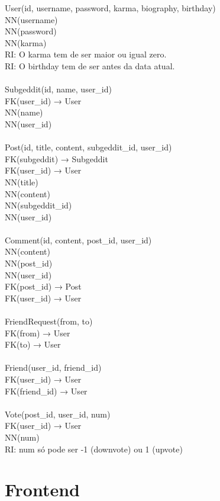 \documentclass{article}
\begin{document}
	User(id, username, password, karma, biography, birthday)\\
	NN(username)\\
	NN(password)\\
	NN(karma)\\
	RI: O karma tem de ser maior ou igual zero.\\
	RI: O birthday tem de ser antes da data atual.\\
	\\
	Subgeddit(id, name, user\_id)\\
	FK(user\_id) → User\\
	NN(name)\\
	NN(user\_id)\\
	\\
	Post(id, title, content, subgeddit\_id, user\_id)\\
	FK(subgeddit) → Subgeddit\\
	FK(user\_id) → User\\
	NN(title)\\
	NN(content)\\
	NN(subgeddit\_id)\\
	NN(user\_id)\\
	\\
	Comment(id, content, post\_id, user\_id)\\
	NN(content)\\
	NN(post\_id)\\
	NN(user\_id)\\
	FK(post\_id) → Post\\
	FK(user\_id) → User\\
	\\
	FriendRequest(from, to)\\
	FK(from) → User\\
	FK(to) → User\\
	\\
	Friend(user\_id, friend\_id)\\
	FK(user\_id) → User\\
	FK(friend\_id) → User\\
	\\
	Vote(post\_id, user\_id, num)\\
	FK(user\_id) → User\\
	NN(num)\\
	RI: num só pode ser -1 (downvote) ou 1 (upvote)\\

	\section{Frontend}
	
\end{document}
